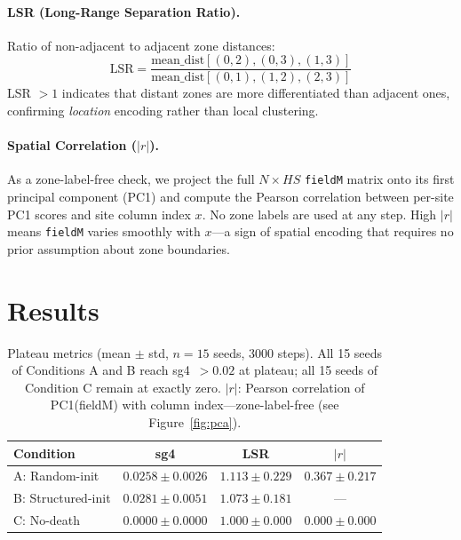 \documentclass[11pt,twocolumn]{article}
\begin{document}
\paragraph{LSR (Long-Range Separation Ratio).}
Ratio of non-adjacent to adjacent zone distances:
\[
\text{LSR} = \frac{\text{mean\_dist}[(0,2),(0,3),(1,3)]}
                   {\text{mean\_dist}[(0,1),(1,2),(2,3)]}
\]
LSR $> 1$ indicates that distant zones are more differentiated than adjacent ones,
confirming \emph{location} encoding rather than local clustering.

\paragraph{Spatial Correlation ($|r|$).}
As a zone-label-free check, we project the full $N \times HS$ \texttt{fieldM}
matrix onto its first principal component (PC1) and compute the Pearson
correlation between per-site PC1 scores and site column index $x$.
No zone labels are used at any step.
High $|r|$ means \texttt{fieldM} varies smoothly with $x$---a sign of
spatial encoding that requires no prior assumption about zone boundaries.

\section{Results}

\begin{table}[h]
\centering
\caption{Plateau metrics (mean $\pm$ std, $n=15$ seeds, 3000 steps).
All 15 seeds of Conditions A and B reach sg4~$> 0.02$ at plateau;
all 15 seeds of Condition C remain at exactly zero.
$|r|$: Pearson correlation of PC1(fieldM) with column index---zone-label-free
(see Figure~\ref{fig:pca}).}
\label{tab:results}
\begin{tabular}{lccc}
\toprule
Condition & sg4 & LSR & $|r|$ \\
\midrule
A: Random-init     & $0.0258 \pm 0.0026$ & $1.113 \pm 0.229$ & $0.367 \pm 0.217$ \\
B: Structured-init & $0.0281 \pm 0.0051$ & $1.073 \pm 0.181$ & --- \\
C: No-death        & $0.0000 \pm 0.0000$ & $1.000 \pm 0.000$ & $0.000 \pm 0.000$ \\
\bottomrule
\end{tabular}
\end{table}
\end{document}
